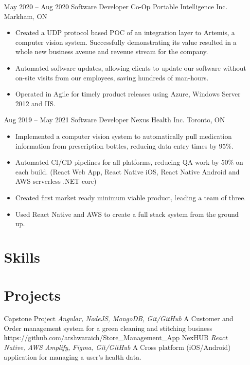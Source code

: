 \documentclass[letterpaper]{moderncv}
\begin{document}
\cventry
{May 2020 -- Aug 2020}
{Software Developer Co-Op}
{Portable Intelligence Inc.}
{Markham, ON}
{}
{\begin{itemize}%
	\item Created a UDP protocol based POC of an integration layer to Artemis, a computer vision system. Successfully demonstrating its value resulted in a whole new business avenue and revenue stream for the company.
	\item Automated software updates, allowing clients to update our software without on-site visits from our employees, saving hundreds of man-hours.
	\item Operated in Agile for timely product releases using Azure, Windows Server 2012 and IIS.
	\end{itemize}}
\cventry
{Aug 2019 -- May 2021}
{Software Developer}
{Nexus Health Inc.}
{Toronto, ON}
{}
{\begin{itemize}%
    \item Implemented a computer vision system to automatically pull medication information from prescription bottles, reducing data entry times by 95\%.
    \item Automated CI/CD pipelines for all platforms, reducing QA work by 50\% on each build. (React Web App, React Native iOS, React Native Android and AWS serverless .NET core)
	\item Created first market ready minimum viable product, leading a team of three.
	\item Used React Native and AWS to create a full stack system from the ground up.
	\end{itemize}}
\section{Skills}
\section{Projects}
\cventry
{}
{Capstone Project}
{}
{\textit{Angular, NodeJS, MongoDB, Git/GitHub}}
{}
{A Customer and Order management system for a green cleaning and stitching business\\https://github.com/arshwaraich/Store\_Management\_App}
\vspace{1mm}
\cventry
{}
{NexHUB}
{}
{\textit{React Native, AWS Amplify, Figma, Git/GitHub}}
{}
{A Cross platform (iOS/Android) application for managing a user's health data.}
\vspace{1mm}
\end{document}
